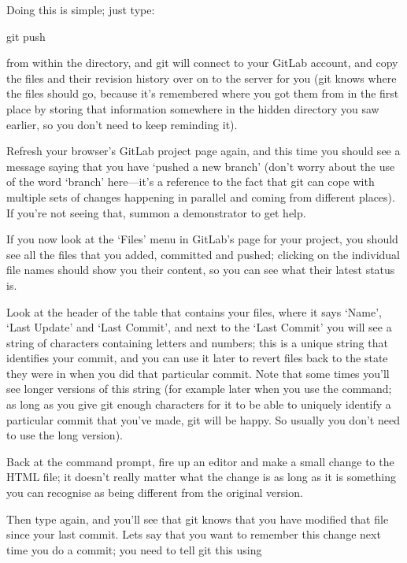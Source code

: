 Doing this is simple; just type:

\begin{ttoutenv}
git push
\end{ttoutenv}

from within the  directory, and git will connect to your GitLab account, and copy the files and their revision history over on to the server for you (git knows where the files should go, because it's remembered where you got them from in the first place by storing that information somewhere in the hidden  directory you saw earlier, so you don't need to keep reminding it). 

Refresh your browser's GitLab project page again, and this time you should see a message saying that you have `pushed a new branch' (don't worry about the use of the word `branch' here---it's a reference to the fact that git can cope with multiple sets of changes happening in parallel and coming from different places). If you're not seeing that, summon a demonstrator to get help. 

If you now look at the `Files' menu in GitLab's page for your  project, you should see all the files that you added, committed and pushed; clicking on the individual file names should show you their content, so you can see what their latest status is. 

Look at the header of the table that contains your files, where it says `Name', `Last Update' and `Last Commit', and next to the `Last Commit' you will see a string of characters containing letters and numbers; this is a unique string that identifies your commit, and you can use it later to revert files back to the state they were in when you did that particular commit. Note that some times you'll see longer versions of this string (for example later when you use the  command; as long as you give git enough characters for it to be able to uniquely identify a particular commit that you've made, git will be happy. So usually you don't need to use the long version).

Back at the command prompt, fire up an editor and make a small change to the HTML file; it doesn't really matter what the change is as long as it is something you can recognise as being different from the original version.

Then type  again, and you'll see that git knows that you have modified that file since your last commit. Lets say that you want to remember this change next time you do a commit; you need to tell git this using 

